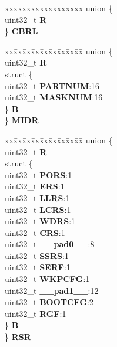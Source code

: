 \begin{DoxyCompactItemize}
\begin{tabbing}
\end{tabbing}\item 
\mbox{\label{structSIU__tag_ae1469d5ac671d2ddca046a17f6df2103}} 
\begin{tabbing}
xx\=xx\=xx\=xx\=xx\=xx\=xx\=xx\=xx\=\kill
union \{\\
\>uint32\_t {\bfseries R}\\
\} {\bfseries CBRL}\\

\end{tabbing}\item 
\mbox{\label{structSIU__tag_aadd41c8be2335b513838d7605abf5ca5}} 
\begin{tabbing}
xx\=xx\=xx\=xx\=xx\=xx\=xx\=xx\=xx\=\kill
union \{\\
\>uint32\_t {\bfseries R}\\
\>struct \{\\
\>\>uint32\_t {\bfseries PARTNUM}:16\\
\>\>uint32\_t {\bfseries MASKNUM}:16\\
\>\} {\bfseries B}\\
\} {\bfseries MIDR}\\

\end{tabbing}\item 
\mbox{\label{structSIU__tag_ae5e3a7baa13a37534f320f0914d552f2}} 
\begin{tabbing}
xx\=xx\=xx\=xx\=xx\=xx\=xx\=xx\=xx\=\kill
union \{\\
\>uint32\_t {\bfseries R}\\
\>struct \{\\
\>\>uint32\_t {\bfseries PORS}:1\\
\>\>uint32\_t {\bfseries ERS}:1\\
\>\>uint32\_t {\bfseries LLRS}:1\\
\>\>uint32\_t {\bfseries LCRS}:1\\
\>\>uint32\_t {\bfseries WDRS}:1\\
\>\>uint32\_t {\bfseries CRS}:1\\
\>\>uint32\_t {\bfseries \_\_pad0\_\_}:8\\
\>\>uint32\_t {\bfseries SSRS}:1\\
\>\>uint32\_t {\bfseries SERF}:1\\
\>\>uint32\_t {\bfseries WKPCFG}:1\\
\>\>uint32\_t {\bfseries \_\_pad1\_\_}:12\\
\>\>uint32\_t {\bfseries BOOTCFG}:2\\
\>\>uint32\_t {\bfseries RGF}:1\\
\>\} {\bfseries B}\\
\} {\bfseries RSR}\\


\end{tabbing}
\end{DoxyCompactItemize}
